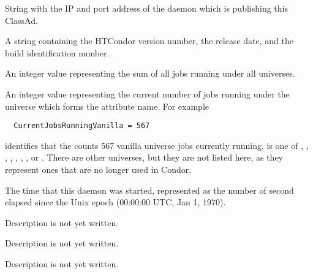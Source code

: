 \begin{description}

\item[\AdAttr{CollectorIpAddr}:] String with the IP and port address of the
   daemon which is publishing this ClassAd.

\item[\AdAttr{CondorVersion}:] A string containing the HTCondor version
number, the release date, and the build identification number.

\item[\AdAttr{CurrentJobsRunningAll}:] An integer value representing the sum of
  all jobs running under all universes.

\item[\AdAttr{CurrentJobsRunning<universe>}:] An integer value representing
  the current number of jobs running under the universe which forms 
  the attribute name.  For example
\begin{verbatim}
  CurrentJobsRunningVanilla = 567
\end{verbatim}
  identifies that the  counts 567 vanilla universe jobs
  currently running.
   is one of 
  , , , ,
  , , , or .
  There are other universes, but they are not listed here, as they represent
  ones that are no longer used in Condor.

\item[\AdAttr{DaemonStartTime}:] The time that this daemon was
  started, represented as the number of second elapsed since
  the Unix epoch (00:00:00 UTC, Jan 1, 1970).

\item[\AdAttr{HostsClaimed}:] Description is not yet written.

\item[\AdAttr{HostsOwner}:] Description is not yet written.

\item[\AdAttr{HostsTotal}:] Description is not yet written.


\end{description}
